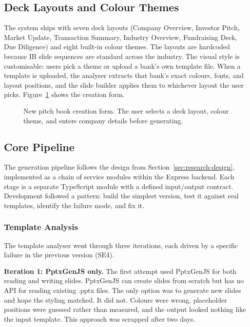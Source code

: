 \subsection{Deck Layouts and Colour Themes}

The system ships with seven deck layouts (Company Overview, Investor Pitch, Market Update, Transaction Summary, Industry Overview, Fundraising Deck, Due Diligence) and eight built-in colour themes. The layouts are hardcoded because IB slide sequences are standard across the industry. The visual style is customisable: users pick a theme or upload a bank's own template file. When a template is uploaded, the analyser extracts that bank's exact colours, fonts, and layout positions, and the slide builder applies them to whichever layout the user picks. Figure~\ref{fig:new-pitchbook} shows the creation form.

\begin{figure}[H]
\centering
{}
\caption{New pitch book creation form. The user selects a deck layout, colour theme, and enters company details before generating.}
\label{fig:new-pitchbook}
\end{figure}

\subsection{Core Pipeline}

The generation pipeline follows the design from Section~\ref{sec:research-design}, implemented as a chain of service modules within the Express backend. Each stage is a separate TypeScript module with a defined input/output contract. Development followed a pattern: build the simplest version, test it against real templates, identify the failure mode, and fix it.

\subsubsection{Template Analysis}

The template analyser went through three iterations, each driven by a specific failure in the previous version (SE4).

\textbf{Iteration 1: PptxGenJS only.} The first attempt used PptxGenJS for both reading and writing slides. PptxGenJS can create slides from scratch but has no API for reading existing .pptx files. The only option was to generate new slides and hope the styling matched. It did not. Colours were wrong, placeholder positions were guessed rather than measured, and the output looked nothing like the input template. This approach was scrapped after two days.

